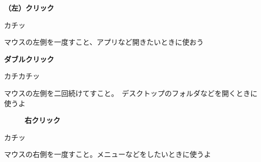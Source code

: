 \documentclass[a4paper,12pt]{jarticle}
\begin{document}
\begin{minipage}{\textwidth}
  \begin{minipage}{5.562cm}
    \centering
    \textbf{（左）クリック}
    \flushleft

    カチッ\\
    \centering

    \flushleft
    マウスの左側を一度すこと、アプリなど開きたいときに使おう
  \end{minipage}
  \begin{minipage}{5.562cm}
    \centering
    \textbf{ダブルクリック}
    \flushleft

    カチカチッ\\
    \centering


    \flushleft
    マウスの左側を二回続けてすこと。　デスクトップのフォルダなどを開くときに使うよ
  \end{minipage}
  \begin{minipage}{5.562cm}
    \centering
    \textbf{~~~~~右クリック}
    \flushleft

    \hspace{3cm} カチッ\\
    \centering


    \flushleft
    マウスの右側を一度すこと。メニューなどをしたいときに使うよ
  \end{minipage}
\end{minipage}
\end{document}
